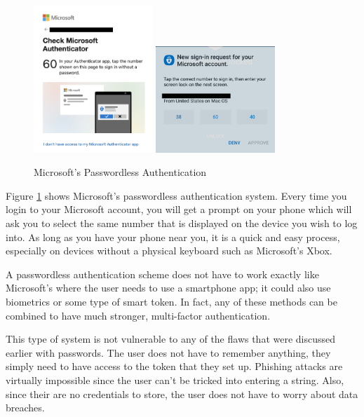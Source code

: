 \documentclass[12pt, letterpaper]{article}
\begin{document}
\begin{figure}[h]
\centering
\includegraphics[width=0.4\textwidth]{mslogin.png}
\includegraphics[width=0.4\textwidth]{authenticator.png}
\caption{Microsoft's Passwordless Authentication\label{msauth}}
\end{figure}

Figure \ref{msauth} shows Microsoft's passwordless authentication system.
Every time you login to your Microsoft account, you will get a prompt on your phone which will ask you to select the same number that is displayed on the device you wish to log into.
As long as you have your phone near you, it is a quick and easy process, especially on devices without a physical keyboard such as Microsoft's Xbox.

A passwordless authentication scheme does not have to work exactly like Microsoft's where the user needs to use a smartphone app; it could also use biometrics or some type of smart token.
In fact, any of these methods can be combined to have much stronger, multi-factor authentication.

This type of system is not vulnerable to any of the flaws that were discussed earlier with passwords.
The user does not have to remember anything, they simply need to have access to the token that they set up.
Phishing attacks are virtually impossible since the user can't be tricked into entering a string.
Also, since their are no credentials to store, the user does not have to worry about data breaches.
\end{document}
